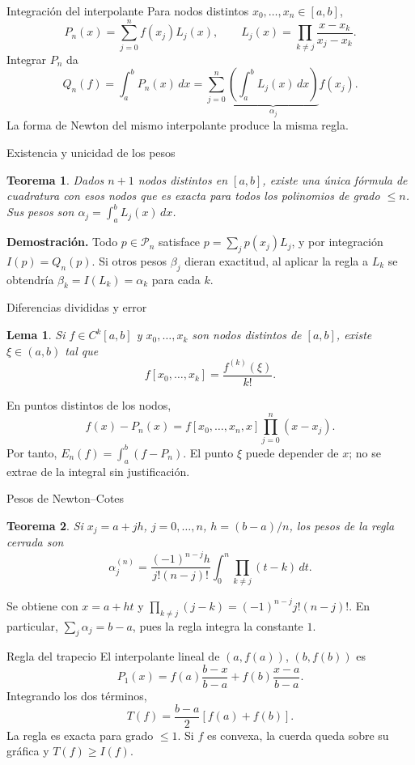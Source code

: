 \documentclass[aspectratio=169,12pt]{beamer}
\newcommand{\PiN}{\mathcal P}
\newtheorem{thm}{Teorema}
\newtheorem{lema}{Lema}
\begin{document}
\begin{frame}{Integración del interpolante}
Para nodos distintos $x_0,\ldots,x_n\in[a,b]$,
\[P_n(x)=\sum_{j=0}^n f(x_j)L_j(x),\qquad
L_j(x)=\prod_{k\ne j}\frac{x-x_k}{x_j-x_k}.\]
Integrar $P_n$ da
\[Q_n(f)=\int_a^b P_n(x)\,dx
=\sum_{j=0}^n\underbrace{\left(\int_a^b L_j(x)\,dx\right)}_{\alpha_j}f(x_j).\]
La forma de Newton del mismo interpolante produce la misma regla.
\end{frame}

\begin{frame}{Existencia y unicidad de los pesos}
\begin{thm}
Dados $n+1$ nodos distintos en $[a,b]$, existe una única fórmula de cuadratura
con esos nodos que es exacta para todos los polinomios de grado $\leq n$.
Sus pesos son $\alpha_j=\int_a^b L_j(x)\,dx$.
\end{thm}
\textbf{Demostración.} Todo $p\in\PiN_n$ satisface
$p=\sum_jp(x_j)L_j$, y por integración $I(p)=Q_n(p)$.
Si otros pesos $\beta_j$ dieran exactitud, al aplicar la regla a $L_k$
se obtendría $\beta_k=I(L_k)=\alpha_k$ para cada $k$.
\end{frame}

\begin{frame}{Diferencias divididas y error}
\begin{lema}
Si $f\in C^k[a,b]$ y $x_0,\ldots,x_k$ son nodos distintos de $[a,b]$,
existe $\xi\in(a,b)$ tal que
\[f[x_0,\ldots,x_k]=\frac{f^{(k)}(\xi)}{k!}.\]
\end{lema}
En puntos distintos de los nodos,
\[f(x)-P_n(x)=f[x_0,\ldots,x_n,x]\prod_{j=0}^n(x-x_j).\]
Por tanto, $E_n(f)=\int_a^b(f-P_n)$.
El punto $\xi$ puede depender de $x$; no se extrae de la integral sin justificación.
\end{frame}

\begin{frame}{Pesos de Newton--Cotes}
\begin{thm}
Si $x_j=a+jh$, $j=0,\ldots,n$, $h=(b-a)/n$, los pesos de la regla cerrada son
\[\alpha_j^{(n)}=
\frac{(-1)^{n-j}h}{j!(n-j)!}
\int_0^n\prod_{k\ne j}(t-k)\,dt.\]
\end{thm}
Se obtiene con $x=a+ht$ y
$\prod_{k\ne j}(j-k)=(-1)^{n-j}j!(n-j)!$.
En particular, $\sum_j\alpha_j=b-a$, pues la regla integra la constante $1$.
\end{frame}

\begin{frame}{Regla del trapecio}
El interpolante lineal de $(a,f(a))$, $(b,f(b))$ es
\[P_1(x)=f(a)\frac{b-x}{b-a}+f(b)\frac{x-a}{b-a}.\]
Integrando los dos términos,
\[\boxed{T(f)=\frac{b-a}{2}[f(a)+f(b)].}\]
La regla es exacta para grado $\leq1$.
Si $f$ es convexa, la cuerda queda sobre su gráfica y $T(f)\geq I(f)$.
\end{frame}
\end{document}
